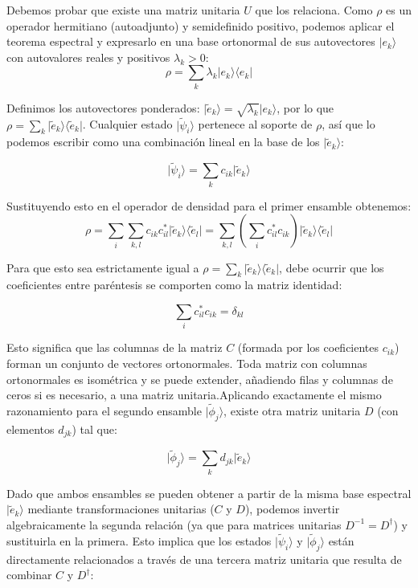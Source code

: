 \documentclass[11pt]{article}
\begin{document}
Debemos probar que existe una matriz unitaria \(U\) que los relaciona.
Como \(\rho\) es un operador hermitiano (autoadjunto) y semidefinido
positivo, podemos aplicar el teorema espectral y expresarlo en una base
ortonormal de sus autovectores \(\vert{}e_k\rangle\) con autovalores
reales y positivos \(\lambda_k > 0\):
\[\rho = \sum_k \lambda_k \vert{}e_k\rangle \langle e_k\vert{}\]

Definimos los autovectores ponderados:
\(\vert{}\tilde{e}_k\rangle = \sqrt{\lambda_k} \vert{}e_k\rangle\), por
lo que
\(\rho = \sum_k \vert{}\tilde{e}_k\rangle \langle \tilde{e}_k\vert{}\).
Cualquier estado \(\vert{}\tilde{\psi}_i\rangle\) pertenece al soporte
de \(\rho\), así que lo podemos escribir como una combinación lineal en
la base de los \(\vert{}\tilde{e}_k\rangle\):

\[\vert{}\tilde{\psi}_i\rangle = \sum_k c_{ik} \vert{}\tilde{e}_k\rangle\]

Sustituyendo esto en el operador de densidad para el primer ensamble
obtenemos:
\[\rho = \sum_i \sum_{k,l} c_{ik} c_{il}^* \vert{}\tilde{e}_k\rangle \langle \tilde{e}_l\vert{} = \sum_{k,l} \left( \sum_i c_{il}^* c_{ik} \right) \vert{}\tilde{e}_k\rangle \langle \tilde{e}_l\vert{}\]

Para que esto sea estrictamente igual a
\(\rho = \sum_k \vert{}\tilde{e}_k\rangle \langle \tilde{e}_k\vert{}\),
debe ocurrir que los coeficientes entre paréntesis se comporten como la
matriz identidad:

\[\sum_i c_{il}^* c_{ik} = \delta_{kl}\]

Esto significa que las columnas de la matriz \(C\) (formada por los
coeficientes \(c_{ik}\)) forman un conjunto de vectores ortonormales.
Toda matriz con columnas ortonormales es isométrica y se puede extender,
añadiendo filas y columnas de ceros si es necesario, a una matriz
unitaria.Aplicando exactamente el mismo razonamiento para el segundo
ensamble \(\vert{}\tilde{\phi}_j\rangle\), existe otra matriz unitaria
\(D\) (con elementos \(d_{jk}\)) tal que:

\[\vert{}\tilde{\phi}_j\rangle = \sum_k d_{jk} \vert{}\tilde{e}_k\rangle\]

Dado que ambos ensambles se pueden obtener a partir de la misma base
espectral \(\vert{}\tilde{e}_k\rangle\) mediante transformaciones
unitarias (\(C\) y \(D\)), podemos invertir algebraicamente la segunda
relación (ya que para matrices unitarias \(D^{-1} = D^\dagger\)) y
sustituirla en la primera. Esto implica que los estados
\(\vert{}\tilde{\psi}_i\rangle\) y \(\vert{}\tilde{\phi}_j\rangle\)
están directamente relacionados a través de una tercera matriz unitaria
que resulta de combinar \(C\) y \(D^\dagger\):
\end{document}
